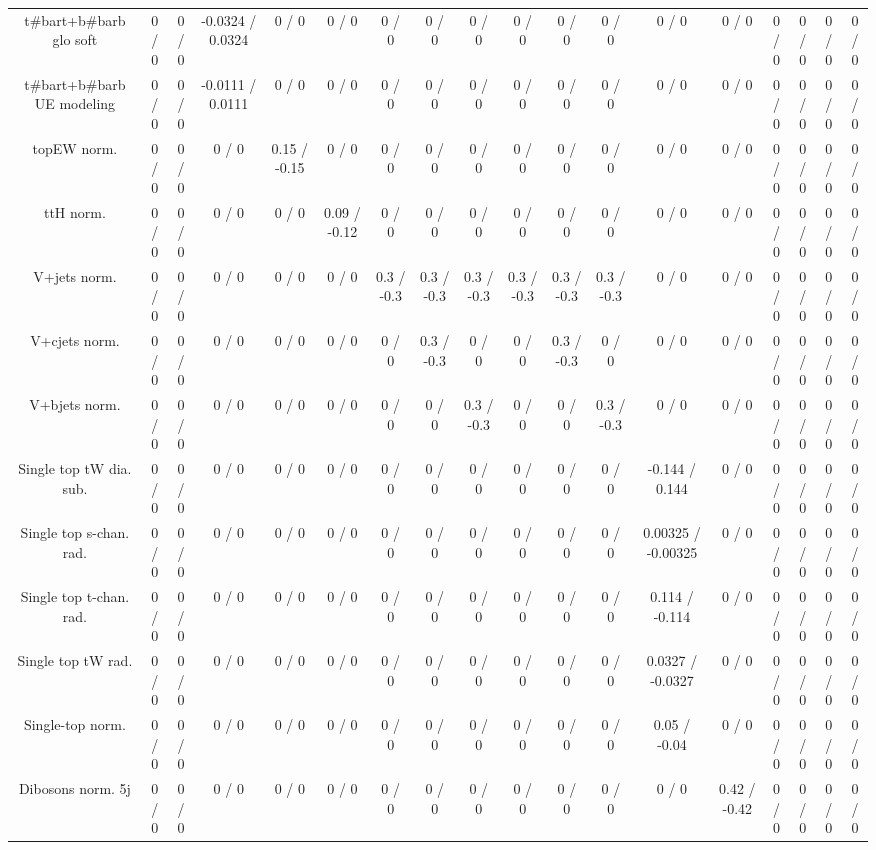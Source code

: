 \documentclass[10pt]{article}
\begin{document}
\begin{table}[htbp]
\begin{center}
\begin{tabular}{|c|c|c|c|c|c|c|c|c|c|c|c|c|c|c|c|c|c|}
  t#bar{t}+b#bar{b} glo soft & 0 / 0 & 0 / 0 & -0.0324 / 0.0324 & 0 / 0 & 0 / 0 & 0 / 0 & 0 / 0 & 0 / 0 & 0 / 0 & 0 / 0 & 0 / 0 & 0 / 0 & 0 / 0 & 0 / 0 & 0 / 0 & 0 / 0 & 0 / 0 \\ 
  t#bar{t}+b#bar{b} UE modeling & 0 / 0 & 0 / 0 & -0.0111 / 0.0111 & 0 / 0 & 0 / 0 & 0 / 0 & 0 / 0 & 0 / 0 & 0 / 0 & 0 / 0 & 0 / 0 & 0 / 0 & 0 / 0 & 0 / 0 & 0 / 0 & 0 / 0 & 0 / 0 \\ 
  topEW norm. & 0 / 0 & 0 / 0 & 0 / 0 & 0.15 / -0.15 & 0 / 0 & 0 / 0 & 0 / 0 & 0 / 0 & 0 / 0 & 0 / 0 & 0 / 0 & 0 / 0 & 0 / 0 & 0 / 0 & 0 / 0 & 0 / 0 & 0 / 0 \\ 
  ttH norm. & 0 / 0 & 0 / 0 & 0 / 0 & 0 / 0 & 0.09 / -0.12 & 0 / 0 & 0 / 0 & 0 / 0 & 0 / 0 & 0 / 0 & 0 / 0 & 0 / 0 & 0 / 0 & 0 / 0 & 0 / 0 & 0 / 0 & 0 / 0 \\ 
  V+jets norm. & 0 / 0 & 0 / 0 & 0 / 0 & 0 / 0 & 0 / 0 & 0.3 / -0.3 & 0.3 / -0.3 & 0.3 / -0.3 & 0.3 / -0.3 & 0.3 / -0.3 & 0.3 / -0.3 & 0 / 0 & 0 / 0 & 0 / 0 & 0 / 0 & 0 / 0 & 0 / 0 \\ 
  V+cjets norm. & 0 / 0 & 0 / 0 & 0 / 0 & 0 / 0 & 0 / 0 & 0 / 0 & 0.3 / -0.3 & 0 / 0 & 0 / 0 & 0.3 / -0.3 & 0 / 0 & 0 / 0 & 0 / 0 & 0 / 0 & 0 / 0 & 0 / 0 & 0 / 0 \\ 
  V+bjets norm. & 0 / 0 & 0 / 0 & 0 / 0 & 0 / 0 & 0 / 0 & 0 / 0 & 0 / 0 & 0.3 / -0.3 & 0 / 0 & 0 / 0 & 0.3 / -0.3 & 0 / 0 & 0 / 0 & 0 / 0 & 0 / 0 & 0 / 0 & 0 / 0 \\ 
  Single top tW dia. sub. & 0 / 0 & 0 / 0 & 0 / 0 & 0 / 0 & 0 / 0 & 0 / 0 & 0 / 0 & 0 / 0 & 0 / 0 & 0 / 0 & 0 / 0 & -0.144 / 0.144 & 0 / 0 & 0 / 0 & 0 / 0 & 0 / 0 & 0 / 0 \\ 
  Single top s-chan. rad. & 0 / 0 & 0 / 0 & 0 / 0 & 0 / 0 & 0 / 0 & 0 / 0 & 0 / 0 & 0 / 0 & 0 / 0 & 0 / 0 & 0 / 0 & 0.00325 / -0.00325 & 0 / 0 & 0 / 0 & 0 / 0 & 0 / 0 & 0 / 0 \\ 
  Single top t-chan. rad. & 0 / 0 & 0 / 0 & 0 / 0 & 0 / 0 & 0 / 0 & 0 / 0 & 0 / 0 & 0 / 0 & 0 / 0 & 0 / 0 & 0 / 0 & 0.114 / -0.114 & 0 / 0 & 0 / 0 & 0 / 0 & 0 / 0 & 0 / 0 \\ 
  Single top tW rad. & 0 / 0 & 0 / 0 & 0 / 0 & 0 / 0 & 0 / 0 & 0 / 0 & 0 / 0 & 0 / 0 & 0 / 0 & 0 / 0 & 0 / 0 & 0.0327 / -0.0327 & 0 / 0 & 0 / 0 & 0 / 0 & 0 / 0 & 0 / 0 \\ 
  Single-top norm. & 0 / 0 & 0 / 0 & 0 / 0 & 0 / 0 & 0 / 0 & 0 / 0 & 0 / 0 & 0 / 0 & 0 / 0 & 0 / 0 & 0 / 0 & 0.05 / -0.04 & 0 / 0 & 0 / 0 & 0 / 0 & 0 / 0 & 0 / 0 \\ 
  Dibosons norm. 5j & 0 / 0 & 0 / 0 & 0 / 0 & 0 / 0 & 0 / 0 & 0 / 0 & 0 / 0 & 0 / 0 & 0 / 0 & 0 / 0 & 0 / 0 & 0 / 0 & 0.42 / -0.42 & 0 / 0 & 0 / 0 & 0 / 0 & 0 / 0 \\ 

\end{tabular}
\end{center}
\end{table}
\end{document}
